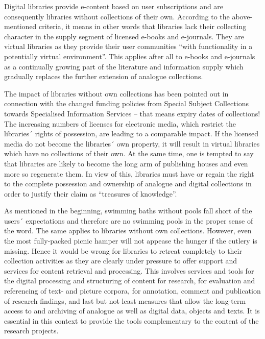 \documentclass[a4paper,
fontsize=11pt,
oneside,
numbers=noperiodatend,
parskip=half-,
bibliography=totoc,
final
]{scrartcl}
\begin{document}
Digital libraries provide e-content based on user subscriptions and are
consequently libraries without collections of their own. According to
the above-mentioned criteria, it means in other words that libraries
lack their collecting character in the supply segment of licensed
e-books and e-journals. They are virtual libraries as they provide their
user communities \enquote{with functionality in a potentially virtual
environment}. This applies after all to e-books and e-journals as a
continually growing part of the literature and information supply which
gradually replaces the further extension of analogue collections.

The impact of libraries without own collections has been pointed out in
connection with the changed funding policies from Special Subject
Collections towards Specialised Information Services -- that means
expiry dates of collections! The increasing numbers of licenses for
electronic media, which restrict the libraries´ rights of possession,
are leading to a comparable impact. If the licensed media do not become
the libraries´ own property, it will result in virtual libraries which
have no collections of their own. At the same time, one is tempted to
say that libraries are likely to become the long arm of publishing
houses and even more so regenerate them. In view of this, libraries must
have or regain the right to the complete possession and ownership of
analogue and digital collections in order to justify their claim as
\enquote{treasures of knowledge}.

As mentioned in the beginning, swimming baths without pools fall short
of the users´ expectations and therefore are no swimming pools in the
proper sense of the word. The same applies to libraries without own
collections. However, even the most fully-packed picnic hamper will not
appease the hunger if the cutlery is missing. Hence it would be wrong
for libraries to retreat completely to their collection activities as
they are clearly under pressure to offer support and services for
content retrieval and processing. This involves services and tools for
the digital processing and structuring of content for research, for
evaluation and referencing of text- and picture corpora, for annotation,
comment and publication of research findings, and last but not least
measures that allow the long-term access to and archiving of analogue as
well as digital data, objects and texts. It is essential in this context
to provide the tools complementary to the content of the research
projects.
\end{document}
